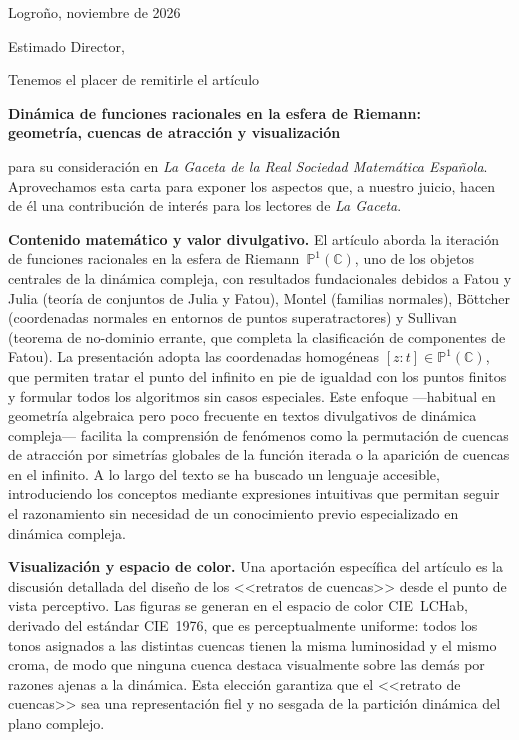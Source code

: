 \documentclass[a4paper,12pt]{article}
\begin{document}
\begin{flushright}
  Logroño, noviembre de 2026
\end{flushright}

\medskip
\noindent
Estimado Director,

\medskip
Tenemos el placer de remitirle el artículo

\begin{center}
  \textbf{Dinámica de funciones racionales en la esfera de Riemann:\\
  geometría, cuencas de atracción y visualización}
\end{center}

\noindent
para su consideración en \emph{La Gaceta de la Real Sociedad Matemática
Española}. Aprovechamos esta carta para exponer los aspectos que, a
nuestro juicio, hacen de él una contribución de interés para los
lectores de \emph{La Gaceta}.

\medskip
\noindent\textbf{Contenido matemático y valor divulgativo.}
El artículo aborda la iteración de funciones racionales en la esfera de
Riemann~$\mathbb{P}^1(\mathbb{C})$, uno de los objetos centrales de la
dinámica compleja, con resultados fundacionales debidos a Fatou y Julia
(teoría de conjuntos de Julia y Fatou), Montel (familias normales),
Böttcher (coordenadas normales en entornos de puntos superatractores) y
Sullivan (teorema de no-dominio errante, que completa la clasificación de
componentes de Fatou). La presentación adopta las coordenadas homogéneas
$[z:t]\in\mathbb{P}^1(\mathbb{C})$, que permiten tratar el punto del
infinito en pie de igualdad con los puntos finitos y formular todos los
algoritmos sin casos especiales. Este enfoque ---habitual en geometría
algebraica pero poco frecuente en textos divulgativos de dinámica
compleja--- facilita la comprensión de fenómenos como la permutación de
cuencas de atracción por simetrías globales de la función iterada o la
aparición de cuencas en el infinito. A lo largo del texto se ha buscado
un lenguaje accesible, introduciendo los conceptos mediante expresiones
intuitivas que permitan seguir el razonamiento sin necesidad de un
conocimiento previo especializado en dinámica compleja.

\medskip
\noindent\textbf{Visualización y espacio de color.}
Una aportación específica del artículo es la discusión detallada del
diseño de los <<retratos de cuencas>> desde el punto de vista perceptivo.
Las figuras se generan en el espacio de color CIE~LCHab, derivado del
estándar CIE~1976, que es perceptualmente uniforme: todos los tonos
asignados a las distintas cuencas tienen la misma luminosidad y el mismo
croma, de modo que ninguna cuenca destaca visualmente sobre las demás
por razones ajenas a la dinámica. Esta elección garantiza que el <<retrato
de cuencas>> sea una representación fiel y no sesgada de la partición
dinámica del plano complejo.
\end{document}
